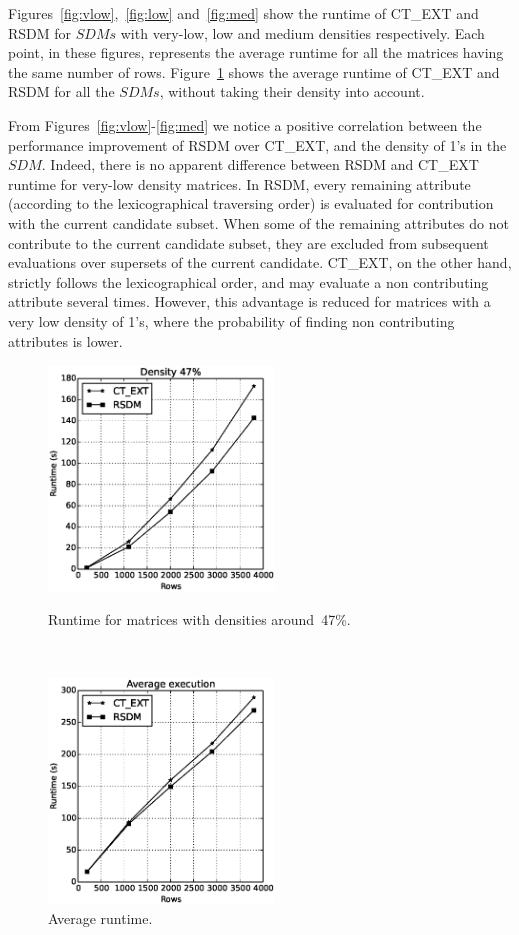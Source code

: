 \documentclass[authoryear,11pt]{elsarticle}
\begin{document}
	Figures~\ref{fig:vlow},~\ref{fig:low} and~\ref{fig:med} show the runtime of CT\_EXT and RSDM for $SDMs$ 
	with very-low, low and medium densities respectively. Each point, in these figures, represents the average
	runtime for all the matrices having the same number of rows. Figure~\ref{fig:average} shows the
	average runtime of CT\_EXT and RSDM for all the $SDMs$, without taking their density into account.
	
	From Figures~\ref{fig:vlow}-\ref{fig:med} we notice a positive correlation between the 
	performance improvement of RSDM over CT\_EXT, and the density of 1's in the $SDM$. Indeed, there is no apparent
	difference between RSDM and CT\_EXT runtime for very-low density matrices. In RSDM, every remaining attribute 
	(according to the lexicographical traversing order) is evaluated for contribution with the current candidate
	subset. 
	When some of the remaining attributes do not contribute to the current candidate subset, they are excluded from 
	subsequent evaluations over supersets of the current candidate. CT\_EXT, on the other hand, strictly follows the 
	lexicographical order, and may evaluate a non contributing attribute several times. However, this advantage is 
	reduced for matrices with a very low density of 1's, where the probability of finding non contributing
	attributes is lower. 
	
	\begin{figure}[htb]
	\centering
	\begin{minipage}{.45\textwidth}
	  \centering
	   \includegraphics[width=6cm , height=6cm]{med_density1.eps}
	  \caption{Runtime for matrices with densities around~47\%.}
	  \label{fig:med}
	\end{minipage}%
	~~~
	\begin{minipage}{.45\textwidth}
	  \centering
	   \includegraphics[width=6cm , height=6cm]{average.eps}
	  \caption{Average runtime.}
	  \label{fig:average}
	\end{minipage}
	\end{figure}	
	
\end{document}
